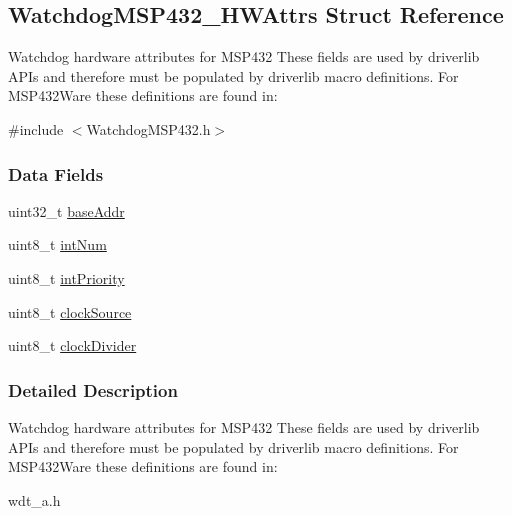 \subsection{Watchdog\+M\+S\+P432\+\_\+\+H\+W\+Attrs Struct Reference}
\label{struct_watchdog_m_s_p432___h_w_attrs}


Watchdog hardware attributes for M\+S\+P432 These fields are used by driverlib A\+P\+Is and therefore must be populated by driverlib macro definitions. For M\+S\+P432\+Ware these definitions are found in\+:  




{\ttfamily \#include $<$Watchdog\+M\+S\+P432.\+h$>$}

\subsubsection*{Data Fields}
\begin{DoxyCompactItemize}
\item 
uint32\+\_\+t \hyperlink{struct_watchdog_m_s_p432___h_w_attrs_a176998d12aea7a88091a774d2808c812}{base\+Addr}
\item 
uint8\+\_\+t \hyperlink{struct_watchdog_m_s_p432___h_w_attrs_ab8e3bf204cffaec1738b0ac6dde3d591}{int\+Num}
\item 
uint8\+\_\+t \hyperlink{struct_watchdog_m_s_p432___h_w_attrs_a64f3c82ab3ce0e2834ac466cbe74569c}{int\+Priority}
\item 
uint8\+\_\+t \hyperlink{struct_watchdog_m_s_p432___h_w_attrs_aa1318d649694d7c5537cc1f9594aac01}{clock\+Source}
\item 
uint8\+\_\+t \hyperlink{struct_watchdog_m_s_p432___h_w_attrs_a047e52982463266b23febfd2835b538f}{clock\+Divider}
\end{DoxyCompactItemize}


\subsubsection{Detailed Description}
Watchdog hardware attributes for M\+S\+P432 These fields are used by driverlib A\+P\+Is and therefore must be populated by driverlib macro definitions. For M\+S\+P432\+Ware these definitions are found in\+: 


\begin{DoxyItemize}
\item wdt\+\_\+a.\+h
\end{DoxyItemize}

